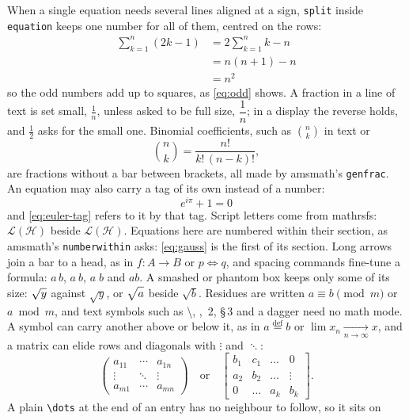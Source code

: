 \documentclass{article}
\numberwithin{equation}{section}
\theoremstyle{definition}
\theoremstyle{remark}
\begin{document}
When a single equation needs several lines aligned at a sign, \texttt{split} inside
\texttt{equation} keeps one number for all of them, centred on the rows:
\begin{equation}
  \begin{split}
    \sum_{k=1}^{n} (2k-1) &= 2 \sum_{k=1}^{n} k - n \\
                         &= n(n+1) - n \\
                         &= n^{2}
  \end{split}
  \label{eq:odd}
\end{equation}
so the odd numbers add up to squares, as \eqref{eq:odd} shows. A fraction in a line of text
is set small, $\frac{1}{n}$, unless asked to be full size, $\dfrac{1}{n}$; in a display
the reverse holds, and $\tfrac{1}{2}$ asks for the small one. Binomial coefficients, such
as $\binom{n}{k}$ in text or
\[
  \binom{n}{k} = \frac{n!}{k!\,(n-k)!} ,
\]
are fractions without a bar between brackets, all made by amsmath's \texttt{genfrac}. An equation may also carry a tag of its own instead of a number:
\begin{equation}
  e^{i\pi} + 1 = 0 \tag{E} \label{eq:euler-tag}
\end{equation}
and \eqref{eq:euler-tag} refers to it by that tag. Script letters come from mathrsfs: $\mathscr{L}(\mathscr{H})$ beside $\mathcal{L}(\mathcal{H})$. Equations here are numbered within their section, as amsmath's \texttt{numberwithin} asks: \eqref{eq:gauss} is the first of its section. Long arrows join a bar to a head, as in
$f\colon A \longrightarrow B$ or $p \iff q$, and spacing commands fine-tune a formula:
$a\,b$, $a\:b$, $a\;b$ and $a\!b$. A smashed or phantom box keeps only some of its
size: $\sqrt{\smash[b]{y}}$ against $\sqrt{y}$, or $\sqrt{\mathstrut a}$ beside
$\sqrt{b}$. Residues are written $a \equiv b \pmod{m}$ or $a \bmod m$, and text
symbols such as \textbackslash, \textbar, \textsection\,2, \S\,3 and a dagger\dag{}
need no math mode. A symbol can carry another above or below it, as in
$a \overset{\mathrm{def}}{=} b$ or $\lim x_n \underset{n\to\infty}{\longrightarrow} x$, and a
matrix can elide rows and diagonals with $\vdots$ and $\ddots$:
\[
\begin{pmatrix} a_{11} & \cdots & a_{1n} \\ \vdots & \ddots & \vdots \\ a_{m1} & \cdots & a_{mn} \end{pmatrix}
\quad\text{or}\quad
\begin{bmatrix} b_1 & c_1 & \dots & 0 \\ a_2 & b_2 & \dots & \vdots \\ 0 & \dots & a_k & b_k \end{bmatrix}.
\] A plain \verb|\dots| at the end of an entry has no neighbour to follow, so it sits on
\end{document}
